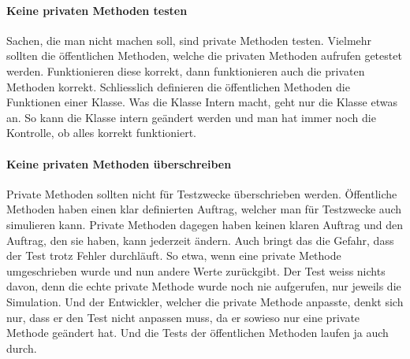 \paragraph{Keine privaten Methoden testen}
Sachen, die man nicht machen soll, sind private Methoden testen. Vielmehr sollten die öffentlichen Methoden, welche die privaten Methoden aufrufen getestet werden. Funktionieren diese korrekt, dann funktionieren auch die privaten Methoden korrekt. Schliesslich definieren die öffentlichen Methoden die Funktionen einer Klasse. Was die Klasse Intern macht, geht nur die Klasse etwas an. So kann die Klasse intern geändert werden und man hat immer noch die Kontrolle, ob alles korrekt funktioniert.
\paragraph{Keine privaten Methoden überschreiben}
Private Methoden sollten nicht für Testzwecke überschrieben werden. Öffentliche Methoden haben einen klar definierten Auftrag, welcher man für Testzwecke auch simulieren kann. Private Methoden dagegen haben keinen klaren Auftrag und den Auftrag, den sie haben, kann jederzeit ändern. Auch bringt das die Gefahr, dass der Test trotz Fehler durchläuft. So etwa, wenn eine private Methode umgeschrieben wurde und nun andere Werte zurückgibt. Der Test weiss nichts davon, denn die echte private Methode wurde noch nie aufgerufen, nur jeweils die Simulation. Und der Entwickler, welcher die private Methode anpasste, denkt sich nur, dass er den Test nicht anpassen muss, da er sowieso nur eine private Methode geändert hat. Und die Tests der öffentlichen Methoden laufen ja auch durch.
